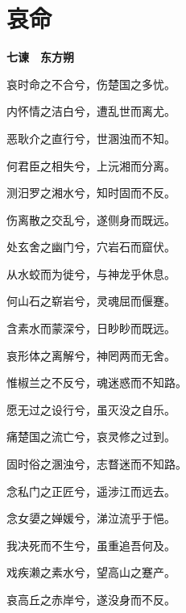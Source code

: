\documentclass[12pt,a4paper]{ctexbook}
\begin{document}
\section{哀命}
\textbf{七谏　东方朔}\par\vspace{0.5em}
哀时命之不合兮，伤楚国之多忧。\par
内怀情之洁白兮，遭乱世而离尤。\par
恶耿介之直行兮，世溷浊而不知。\par
何君臣之相失兮，上沅湘而分离。\par
测汨罗之湘水兮，知时固而不反。\par
伤离散之交乱兮，遂侧身而既远。\par
处玄舍之幽门兮，穴岩石而窟伏。\par
从水蛟而为徙兮，与神龙乎休息。\par
何山石之崭岩兮，灵魂屈而偃蹇。\par
含素水而蒙深兮，日眇眇而既远。\par
哀形体之离解兮，神罔两而无舍。\par
惟椒兰之不反兮，魂迷惑而不知路。\par
愿无过之设行兮，虽灭没之自乐。\par
痛楚国之流亡兮，哀灵修之过到。\par
固时俗之溷浊兮，志瞀迷而不知路。\par
念私门之正匠兮，遥涉江而远去。\par
念女嬃之婵媛兮，涕泣流乎于悒。\par
我决死而不生兮，虽重追吾何及。\par
戏疾濑之素水兮，望高山之蹇产。\par
哀高丘之赤岸兮，遂没身而不反。\par
\end{document}
